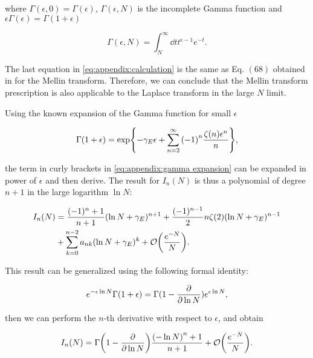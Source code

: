 \documentclass[../Tesi_Jiahao_Miao_986136.tex]{subfiles}
\begin{document}
where $\Gamma(\epsilon,0) = \Gamma(\epsilon)$, $\Gamma(\epsilon,N)$ is the incomplete Gamma function and $\epsilon \Gamma(\epsilon)=\Gamma(1+\epsilon)$

\begin{equation}
    \Gamma(\epsilon,N) = \int_N^\infty \dd{t} t^{\epsilon-1} e^{-t}.
\end{equation}

The last equation in \cref{eq:appendix:calculation} is the same as Eq. $(68)$ obtained in \cite{Catani_2003_appendix} for the Mellin transform. Therefore, 
we can conclude that the Mellin transform prescription is also applicable to the Laplace transform in the large $N$ limit.

Using the known expansion of the Gamma function for small $\epsilon$ 

\begin{equation}\label{eq:appendix:gamma expansion}
    \Gamma(1+\epsilon) = \exp{-\gamma_E \epsilon + \sum_{n=2}^\infty \qty(-1)^n \frac{\zeta(n) \epsilon^n}{n}},
\end{equation}

the term in curly brackets in \cref{eq:appendix:gamma expansion} can be expanded in power of $\epsilon$ and then derive. The result for $I_n(N)$ is thus a 
polynomial of degree $n+1$ in the large logarithm $\ln N$:

\begin{align}
    \begin{split}\label{eq:appendix:In expansion}    
        I_n(N) &= \frac{(-1)^n+1}{n+1} (\ln N + \gamma_E)^{n+1} + \frac{(-1)^{n-1}}{2} n \zeta(2) (\ln N + \gamma_E)^{n-1} \\
        &+ \sum_{k=0}^{n-2} a_{nk} (\ln N + \gamma_E)^k + \order{\frac{e^{-N}}{N}}.
    \end{split}
\end{align}

This result can be generalized using the following formal identity:

\begin{equation}
    e^{-\epsilon \ln N} \Gamma(1+\epsilon) = \Gamma(1- \pdv{\ln N}) e^{\epsilon \ln N },
\end{equation}

then we can perform the $n$-th derivative with respect to $\epsilon$, and obtain

\begin{equation}
    I_n(N) = \Gamma\qty(1-\pdv{\ln N}) \frac{ \qty(-\ln N)^n+1}{n+1} + \order{\frac{e^{-N}}{N}}.
\end{equation}
\end{document}
